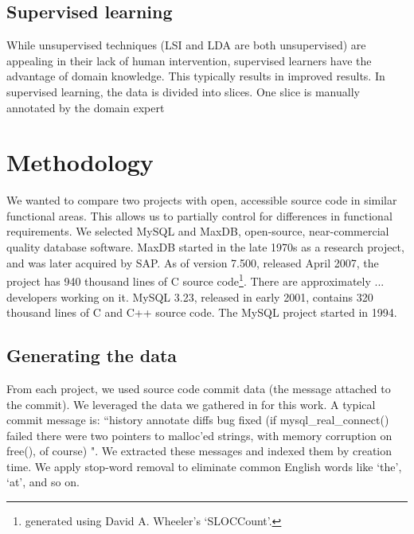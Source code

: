 \documentclass[10pt, conference, compsocconf]{IEEEtran}
\begin{document}
\subsection{Supervised learning}
While unsupervised techniques (LSI and LDA are both unsupervised) are appealing in their lack of human intervention, supervised learners have the advantage of domain knowledge. This typically results in improved results. In supervised learning, the data is divided into slices. One slice is manually annotated by the domain expert

 
\section{Methodology}

We wanted to compare two projects with open, accessible source code in similar functional areas. This allows us to partially control for differences in functional requirements. We selected MySQL and MaxDB, open-source, near-commercial quality database software. MaxDB started in the late 1970s as a research project, and was later acquired by SAP. As of version 7.500, released April 2007, the project has 940 thousand lines of C source code\footnote{generated using David A. Wheeler's `SLOCCount'.}. There are approximately ... developers working on it. MySQL 3.23, released in early 2001, contains 320 thousand lines of C and C++ source code. The MySQL project started in 1994.

\subsection{Generating the data}
From each project, we used source code commit data (the message attached to the commit). We leveraged the data we gathered in \cite{Hindle09ICSM} for this work. A typical commit message is: ``history annotate diffs bug fixed (if mysql\_real\_connect() failed there were two pointers to malloc'ed strings, with memory corruption on free(), of course) ". We extracted these messages and indexed them by creation time. We apply stop-word removal to eliminate common English words like `the', `at', and so on.
\end{document}

